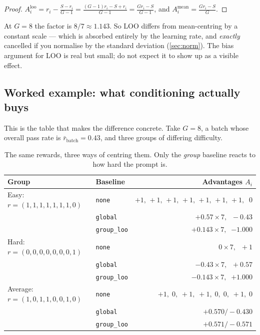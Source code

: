 \documentclass[11pt,letterpaper]{article}
\theoremstyle{definition}
\newcommand{\Adv}{A}
\begin{document}
\begin{proof}
$\Adv_i^{\text{loo}} = r_i - \frac{S - r_i}{G-1} = \frac{(G-1)r_i - S + r_i}{G-1} = \frac{G r_i - S}{G-1}$,
and $\Adv_i^{\text{mean}} = \frac{G r_i - S}{G}$.
\end{proof}

At $G = 8$ the factor is $8/7 \approx 1.143$. So LOO differs from mean-centring by a constant scale
--- which is absorbed entirely by the learning rate, and \emph{exactly} cancelled if you normalise by
the standard deviation (\cref{sec:norm}). The bias argument for LOO is real but small; do not expect
it to show up as a visible effect.

\subsection{Worked example: what conditioning actually buys}
\label{sec:worked}

This is the table that makes the difference concrete. Take $G = 8$, a batch whose overall pass rate is
$\bar{r}_{\text{batch}} = 0.43$, and three groups of differing difficulty.

\begin{table}[H]
\centering
\caption{The same rewards, three ways of centring them. Only the \emph{group} baseline reacts to how
hard the prompt is.}
\label{tab:worked}
\small
\begin{tabular}{@{}llr@{}}
\toprule
\textbf{Group} & \textbf{Baseline} & \textbf{Advantages $\Adv_i$} \\
\midrule
Easy: $r = (1,1,1,1,1,1,1,0)$
  & \texttt{none}      & $+1,\,+1,\,+1,\,+1,\,+1,\,+1,\,+1,\;\;0$ \\
  & \texttt{global}    & $+0.57 \times 7,\;\; -0.43$ \\
  & \texttt{group\_loo}& $+0.143 \times 7,\;\; \mathbf{-1.000}$ \\
\midrule
Hard: $r = (0,0,0,0,0,0,0,1)$
  & \texttt{none}      & $0 \times 7,\;\; +1$ \\
  & \texttt{global}    & $-0.43 \times 7,\;\; +0.57$ \\
  & \texttt{group\_loo}& $-0.143 \times 7,\;\; \mathbf{+1.000}$ \\
\midrule
Average: $r = (1,0,1,1,0,0,1,0)$
  & \texttt{none}      & $+1,\;0,\;+1,\;+1,\;0,\;0,\;+1,\;0$ \\
  & \texttt{global}    & $+0.570 / -0.430$ \\
  & \texttt{group\_loo}& $+0.571 / -0.571$ \\
\bottomrule
\end{tabular}
\end{table}
\end{document}
